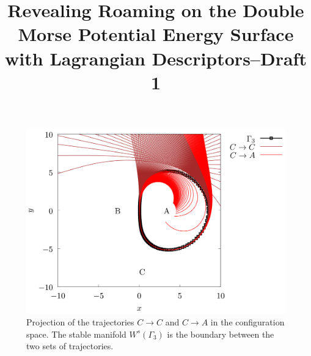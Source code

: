 \documentclass[12pt,a4paper]{article}
\title{Revealing Roaming  on the Double Morse Potential Energy Surface with Lagrangian Descriptors--Draft 1}
\begin{document}
\begin{figure}
\begin{center}
\includegraphics{orbits_CC_CA.jpg}
\caption{Projection of the trajectories $C \rightarrow C$ and $C \rightarrow A$ in the configuration space. The stable manifold $W^s(\Gamma_3)$ is the boundary between the two sets of trajectories.
\label{fig:orbits_CC_CA}}
\end{center}
\end{figure}
\end{document}
